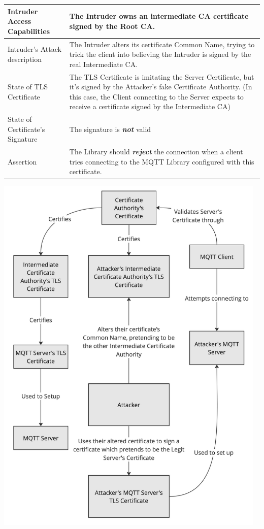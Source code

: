 \documentclass[binding=0.6cm,noexaminfo]{sapthesis}
\begin{document}
\begin{center}
\begin{tabular}{| p{6cm} | p{6cm} |}
\hline
Intruder Access Capabilities & The Intruder owns an intermediate CA certificate signed by the Root CA. \\
\hline
Intruder’s Attack description & The Intruder alters its certificate Common Name, trying to trick the client into believing the Intruder is signed by the real Intermediate CA. \\
\hline
State of TLS Certificate & The TLS Certificate is imitating the Server Certificate, but it’s signed by the Attacker’s fake Certificate Authority. (In this case, the Client connecting to the Server expects to receive a certificate signed by the Intermediate CA) \\
\hline
State of Certificate’s Signature & The signature is \textbf{\textit{not}} valid \\
\hline
Assertion & The Library should \textbf{\textit{reject}} the connection when a client tries connecting to the MQTT Library configured with this certificate. \\
\hline
\end{tabular}
\end{center}

\newpage
\includegraphics[width=13cm]{TC10}
\end{document}
